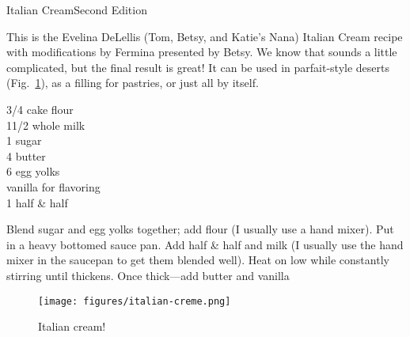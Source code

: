\begin{entry}{Italian Cream}{Second Edition}

\begin{open}
    This is the Evelina DeLellis (Tom, Betsy, and Katie's Nana) Italian Cream
    recipe with modifications by Fermina presented by Betsy.  We know that
    sounds a little complicated, but the final result is great!  It can be used
    in parfait-style deserts (Fig.~\ref{fig:italian-cream}), as a filling for
    pastries, or just all by itself.
\end{open}
\begin{ingredients}
    \SI{3/4}{\cup} cake flour\\
    1\SI{1/2}{\cup} whole milk\\
    \SI{1}{\cup} sugar\\
    \SI{4}{\teaspoon} butter\\
    6 egg yolks\\
    vanilla for flavoring\\
    \SI{1}{\quart} half \& half
\end{ingredients}
Blend sugar and egg yolks together; add flour (I usually use a hand mixer). Put
in a heavy bottomed sauce pan. Add half \& half and milk (I usually use the hand
mixer in the saucepan to get them blended well). Heat on low while constantly
stirring until thickens. Once thick---add butter and vanilla

\begin{figure}[b]
    \centering
    \texttt{[image: figures/italian-creme.png]}
    \caption{Italian cream!}
    \label{fig:italian-cream}
\end{figure}
\end{entry}


